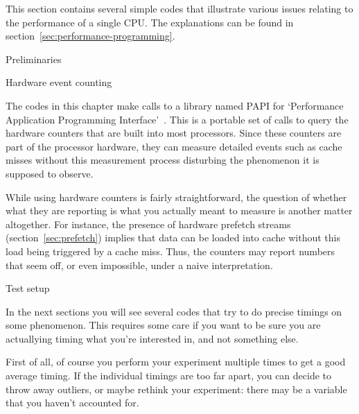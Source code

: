 
This section contains several simple codes that illustrate various
issues relating to the performance of a single CPU. The explanations
can be found in section~\ref{sec:performance-programming}.

 {Preliminaries}

 {Hardware event counting}
\label{sec:papi}

The codes in this chapter make calls to a library named PAPI for
`Performance Application Programming
Interface'~\cite{papi,papi-homepage}. This is a portable set of calls
to query the hardware counters that are built into most
processors. Since these counters are part of the processor hardware,
they can measure detailed events such as cache misses without this
measurement process disturbing the phenomenon it is supposed to
observe.

While using hardware counters is fairly straightforward, the question
of whether what they are reporting is what you actually meant to
measure is another matter altogether. For instance, the presence of
hardware prefetch streams (section~\ref{sec:prefetch}) implies that
data can be loaded into cache without this load being triggered by a
cache miss. Thus, the counters may report numbers that seem off, or
even impossible, under a naive interpretation.

 {Test setup}

In the next sections you will see several codes that try to do 
precise timings on some phenomenon. This requires some care if you
want to be sure you are actuallying timing what you're interested in, and
not something else. 

First of all, of course you perform your experiment 
multiple times to get a good average timing. If the individual timings
are too far apart, you can decide to throw away outliers, or maybe
rethink your experiment: there may be a variable that you haven't accounted
for.

